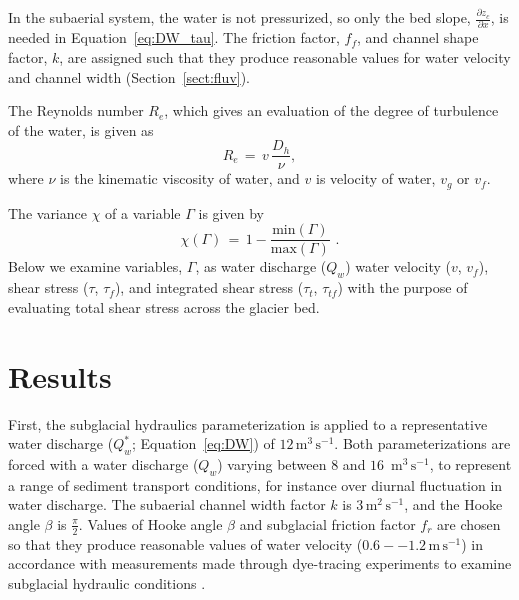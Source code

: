 \documentclass[11pt]{article}
\newcommand{\unit}[1]{$\mathrm{#1}$}
\begin{document}
\begin{spacing}{1}
  
  In the subaerial system, the water is not pressurized, so only the bed slope, $\frac{\partial z_c}{\partial x}$, is needed in Equation~\ref{eq:DW_tau}. The friction factor, $f_f$, and channel shape factor, $k$, are assigned such that they produce reasonable values for water velocity and channel width  (Section~\ref{sect:fluv}).
  
  The Reynolds number $R_e$, which gives an evaluation of the degree of turbulence of the water, is given as 
  \begin{equation}
    \label{eq:re}
    R_e\,=\, v \,\frac{D_h}{\nu},
  \end{equation}
  \noindent where $\nu$ is the kinematic viscosity of water, and  $v$ is velocity of water, $v_g$ or $v_f$.
  
  The variance $ \chi$ of a variable $\Gamma$ is given by 
  \begin{equation}
    \label{eq:var}
    \chi(\Gamma) \,=\, 1 - \frac{\mathrm{min}(\Gamma)}{\mathrm{max}(\Gamma)}\,\,.
  \end{equation}
  \noindent Below we examine variables, $\Gamma$, as water discharge ($Q_w$) water velocity ($v$, $v_f$), shear stress ($\tau$, $\tau_f$), and integrated shear stress ($\tau_t$, $\tau_{tf}$) with the purpose of evaluating total shear stress across the glacier bed.
  
  
  \section{Results}
  First, the subglacial hydraulics parameterization is applied to a representative water discharge ($Q_w^*$; Equation~\ref{eq:DW}) of $12$\,\unit{m}$^{3}$\,\unit{s}$^{-1}$.
  Both parameterizations are forced with a water discharge ($Q_w$) varying between $8$ and $16$ \,\unit{m}$^{3}$\,\unit{s}$^{-1}$, to represent a range of sediment transport conditions, for instance over diurnal fluctuation in water discharge. The subaerial channel width factor $k$ is $3$\,\unit{m}$^{2}$\,\unit{s}$^{-1}$, and the Hooke angle $\beta$ is $\frac{\pi}{2}$.
  Values of Hooke angle $\beta$ and subglacial friction factor $f_r$ are chosen so that they produce reasonable values of water velocity ($0.6-- 1.2$\,\unit{m}\,\unit{s}$^{-1}$) in accordance with measurements made through dye-tracing experiments to examine subglacial hydraulic conditions \citep[Section~\ref{sect:sub_mode}, Figure~\ref{fig:model_outs}; e.g.][]{werder2010}.
  

\end{spacing}
\end{document}
